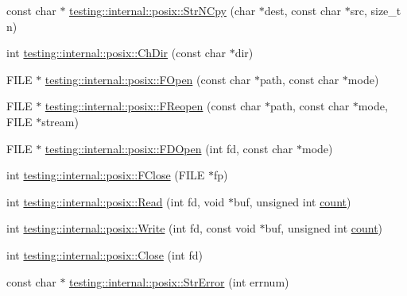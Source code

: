 \begin{DoxyCompactItemize}
\item 
const char $\ast$ \mbox{\hyperlink{namespacetesting_1_1internal_1_1posix_a3defc980438fce16cf5320a458ccea17}{testing\+::internal\+::posix\+::\+Str\+N\+Cpy}} (char $\ast$dest, const char $\ast$src, size\+\_\+t n)
\item 
int \mbox{\hyperlink{namespacetesting_1_1internal_1_1posix_a1ddc8a4fc6bb21da372307485591a212}{testing\+::internal\+::posix\+::\+Ch\+Dir}} (const char $\ast$dir)
\item 
F\+I\+LE $\ast$ \mbox{\hyperlink{namespacetesting_1_1internal_1_1posix_affa05d06d3e3b1ce975935cb0eac4fa7}{testing\+::internal\+::posix\+::\+F\+Open}} (const char $\ast$path, const char $\ast$mode)
\item 
F\+I\+LE $\ast$ \mbox{\hyperlink{namespacetesting_1_1internal_1_1posix_a7428e40e37fc1798e36804eafc11680b}{testing\+::internal\+::posix\+::\+F\+Reopen}} (const char $\ast$path, const char $\ast$mode, F\+I\+LE $\ast$stream)
\item 
F\+I\+LE $\ast$ \mbox{\hyperlink{namespacetesting_1_1internal_1_1posix_a78eb38374e5a5c87ab0cbb30583627f7}{testing\+::internal\+::posix\+::\+F\+D\+Open}} (int fd, const char $\ast$mode)
\item 
int \mbox{\hyperlink{namespacetesting_1_1internal_1_1posix_af4beeaaa8d62916d5e3b644a1ddfbd6b}{testing\+::internal\+::posix\+::\+F\+Close}} (F\+I\+LE $\ast$fp)
\item 
int \mbox{\hyperlink{namespacetesting_1_1internal_1_1posix_a3c6ab13e581a56f1b02f3eb7536c97fd}{testing\+::internal\+::posix\+::\+Read}} (int fd, void $\ast$buf, unsigned int \mbox{\hyperlink{_obj__test_2lib_2googletest-release-1_88_81_2googlemock_2test_2gmock__stress__test_8cc_afd9db40e3361ae09188795e8cbe19752}{count}})
\item 
int \mbox{\hyperlink{namespacetesting_1_1internal_1_1posix_af4acf9f78d55f815a18b43786511abef}{testing\+::internal\+::posix\+::\+Write}} (int fd, const void $\ast$buf, unsigned int \mbox{\hyperlink{_obj__test_2lib_2googletest-release-1_88_81_2googlemock_2test_2gmock__stress__test_8cc_afd9db40e3361ae09188795e8cbe19752}{count}})
\item 
int \mbox{\hyperlink{namespacetesting_1_1internal_1_1posix_a15e5b8f2a535ef1b2529b85b861e4846}{testing\+::internal\+::posix\+::\+Close}} (int fd)
\item 
const char $\ast$ \mbox{\hyperlink{namespacetesting_1_1internal_1_1posix_a6e7e77c37cacb64c32234b988b10933c}{testing\+::internal\+::posix\+::\+Str\+Error}} (int errnum)
\item 

\end{DoxyCompactItemize}
